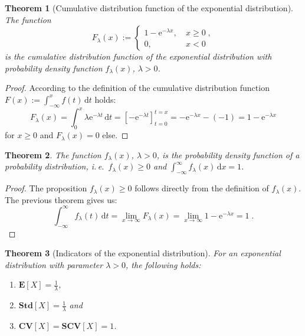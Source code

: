\documentclass[a4paper,11pt,oneside]{article}
\newtheorem{theorem}{Theorem}
\theoremstyle{definition}
\begin{document}
\begin{theorem}[Cumulative distribution function of the exponential distribution]
The function
$$
F_{\lambda}(x):=\left\{\begin{matrix}
1-\mathrm{e}^{-\lambda x},&~x\ge0\;,\\
0,&~x<0
\end{matrix}\right.
$$
is the cumulative distribution function of the exponential distribution with probability density function $f_\lambda(x)$, $\lambda>0$.
\end{theorem}

\begin{proof}
According to the definition of the cumulative distribution function $F(x):=\int_{-\infty}^x f(t)\,\mbox{d}t$ holds:
$$
F_\lambda(x)=\int_0^x \lambda \mathrm{e}^{-\lambda t}\,\mbox{d}t=\left[-\mathrm{e}^{-\lambda t}\right]_{t=0}^{t=x}=-\mathrm{e}^{-\lambda x}-(-1)=1-\mathrm{e}^{-\lambda x}
$$
for $x\ge0$ and $F_\lambda(x)=0$ else.
\end{proof}

\begin{theorem}
The function $f_\lambda(x)$, $\lambda>0$, is the probability density function of a probability distribution, i.\,e.\ $f_\lambda(x)\ge0$ and $\int_{-\infty}^\infty f_\lambda(x)\,\mbox{d}x=1$.
\end{theorem}

\begin{proof}
The proposition $f_\lambda(x)\ge0$ follows directly from the definition of $f_\lambda(x)$. The previous theorem gives us:
$$
\int_{-\infty}^\infty f_\lambda(t)\,\mbox{d}t=\lim_{x\to\infty}F_\lambda(x)=\lim_{x\to\infty}1-\mathrm{e}^{-\lambda x}=1\;.
$$
\end{proof}

\begin{theorem}[Indicators of the exponential distribution]
For an exponential distribution with parameter $\lambda>0$, the following holds:
\begin{enumerate}
\item $\mathbf{E}[X]=\frac{1}{\lambda}$,
\item $\mathbf{Std}[X]=\frac{1}{\lambda}$ and
\item $\mathbf{CV}[X]=\mathbf{SCV}[X]=1$.
\end{enumerate}
\end{theorem}
\end{document}
